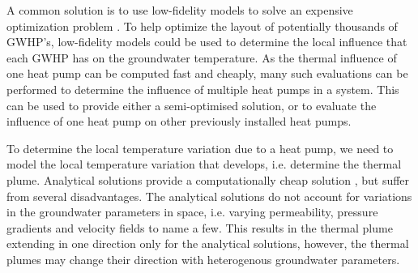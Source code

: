 \documentclass{article} %
\begin{document}
A common solution is to use low-fidelity models to solve an expensive optimization problem \cite{Sbai2019, Nagoor2019, Robinson2012}. 
To help optimize the layout of potentially thousands of GWHP's, low-fidelity models could be used to determine the local influence that each GWHP has on the groundwater temperature. 
As the thermal influence of one heat pump can be computed fast and cheaply, many such evaluations can be performed to determine the influence of multiple heat pumps in a system. 
This can be used to provide either a semi-optimised solution, or to evaluate the influence of one heat pump on other previously installed heat pumps. 

To determine the local temperature variation due to a heat pump, we need to model the local temperature variation that develops, i.e. determine the thermal plume. 
Analytical solutions provide a computationally cheap solution \cite{Pophillat2020}, but suffer from several disadvantages. 
The analytical solutions do not account for variations in the groundwater parameters in space, i.e. varying permeability, pressure gradients and velocity fields to name a few.
This results in the thermal plume extending in one direction only for the analytical solutions, however, the thermal plumes may change their direction with heterogenous groundwater parameters. 





\end{document}
